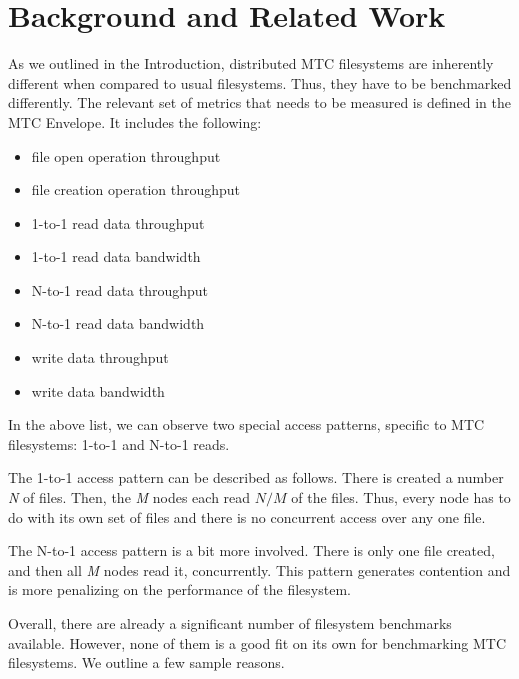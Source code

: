 
\chapter{Background and Related Work} %

\label{Chapter2} %



As we outlined in the Introduction, distributed MTC filesystems are inherently different when compared to usual filesystems. Thus, they have to be benchmarked differently. The relevant set of metrics that needs to be measured is defined in the MTC Envelope\cite{envelope}. It includes the following:

\begin{itemize}

\item file open operation throughput
\item file creation operation throughput
\item 1-to-1 read data throughput
\item 1-to-1 read data bandwidth
\item N-to-1 read data throughput
\item N-to-1 read data bandwidth
\item write data throughput
\item write data bandwidth

\end{itemize}

In the above list, we can observe two special access patterns, specific to MTC filesystems: 1-to-1 and N-to-1 reads.

The 1-to-1 access pattern can be described as follows. There is created a number \textit{N} of files. Then, the \textit{M} nodes each read $N / M$ of the files. Thus, every node has to do with its own set of files and there is no concurrent access over any one file.

The N-to-1 access pattern is a bit more involved. There is only one file created, and then all \textit{M} nodes read it, concurrently. This pattern generates contention and is more penalizing on the performance of the filesystem.

Overall, there are already a significant number of filesystem benchmarks available\cite{fsbench}. However, none of them is a good fit on its own for benchmarking MTC filesystems. We outline a few sample reasons.

